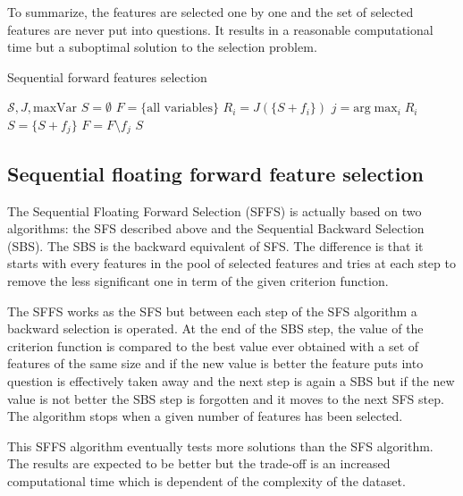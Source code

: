 \documentclass[a4paper,11pt,DIV=16]{scrartcl}
\begin{document}
    To summarize, the features are selected one by one and the set of selected features are never put into questions. It results in a reasonable computational time but a suboptimal solution to the selection problem.

    \begin{algorithm}
    \caption{Sequential forward features selection\label{alg:sfs}}
    \begin{algorithmic}[1]
    \REQUIRE $\mathcal{S},J,\text{maxVar}$
    \STATE $S=\emptyset$
    \STATE $F=\text{\{all variables\}}$
    \STATE $R_i = J(\{S + f_i\})$
    \ENDFOR
    \STATE $j=\text{arg} \max_{i} R_i$
    \STATE $S = \{S + f_j\}$
    \STATE $F = F \setminus f_j$
    \ENDWHILE
    \RETURN $S$
    \end{algorithmic}
    \end{algorithm}

    \subsection{Sequential floating forward feature selection}

    \label{sec:floating-presentation}

    The Sequential Floating Forward Selection (SFFS) is actually based on two algorithms: the SFS described above and the Sequential Backward Selection (SBS). The SBS is the backward equivalent of SFS. The difference is that it starts with every features in the pool of selected features and tries at each step to remove the less significant one in term of the given criterion function.

    The SFFS works as the SFS but between each step of the SFS algorithm a backward selection is operated. At the end of the SBS step, the value of the criterion function is compared to the best value ever obtained with a set of features of the same size and if the new value is better the feature puts into question is effectively taken away and the next step is again a SBS but if the new value is not better the SBS step is forgotten and it moves to the next SFS step. The algorithm stops when a given number of features has been selected.

    This SFFS algorithm eventually tests more solutions than the SFS algorithm. The results are expected to be better but the trade-off is an increased computational time which is dependent of the complexity of the dataset.
\end{document}
